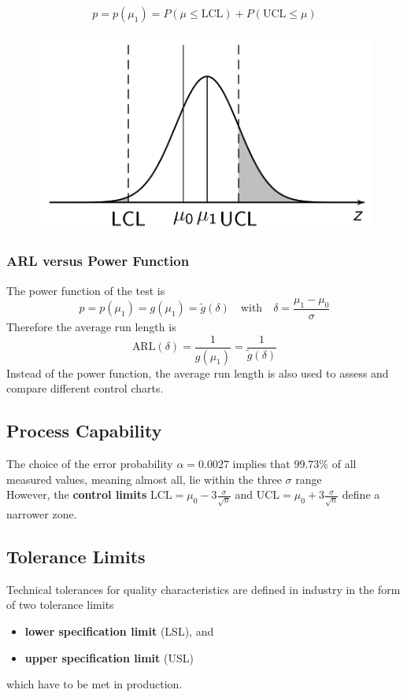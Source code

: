 \documentclass[11pt]{article}
\theoremstyle{definition}
\begin{document}
\begin{equation*}
	p = p(\mu_1) = P(\mu\leq \text{LCL}) + P(\text{UCL} \leq \mu)
\end{equation*}

\begin{figure}[H]
	\centering
	\includegraphics[width=0.6\linewidth]{img/average_run_length}
\end{figure}


\subsubsection{ARL versus Power Function}
The power function of the test is
\begin{equation*}
	p = p(\mu_1) = g(\mu_1) =\tilde{g}(\delta)\quad\text{with}\quad \delta=\frac{\mu_1-\mu_0}{\sigma}
\end{equation*}
Therefore the average run length is
\begin{equation*}
	\text{ARL}(\delta) = \frac{1}{g(\mu_1)} =\frac{1}{\tilde{g}(\delta)}
\end{equation*}
Instead of the power function, the average run length is also used to assess and compare different control charts.

\subsection{Process Capability}
The choice of the error probability $\alpha=0.0027$ implies that $99.73\%$ of all measured values, meaning almost all, lie within the three $\sigma$ range
\begin{equation*}
	[\mu_0 - 3\sigma, \mu_0 + 3\sigma]
\end{equation*}
However, the \textbf{control limits} $\text{LCL}=\mu_0 - 3\frac{\sigma}{\sqrt{n}}$ and $\text{UCL}=\mu_0 + 3\frac{\sigma}{\sqrt{n}}$ define a narrower zone.

\subsection{Tolerance Limits}
Technical tolerances for quality characteristics are defined in industry in the form of two tolerance limits
\begin{itemize}[nosep]
	\item \textbf{lower specification limit} (LSL), and
	\item \textbf{upper specification limit} (USL)
\end{itemize}
which have to be met in production.
\end{document}
